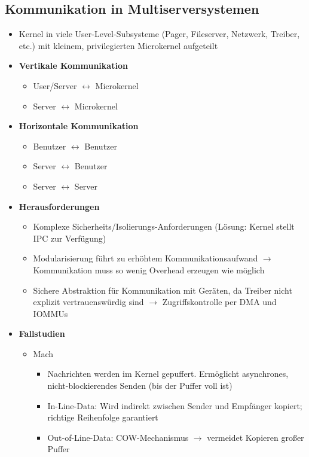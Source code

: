 \subsection{Kommunikation in Multiserversystemen}
\begin{itemize}
	\item Kernel in viele User-Level-Subsysteme (Pager, Fileserver, Netzwerk, Treiber, etc.) mit kleinem, privilegierten Microkernel aufgeteilt
	\item \textbf{Vertikale Kommunikation}
	\begin{itemize}
		\item User/Server \(\leftrightarrow\) Microkernel
		\item Server \(\leftrightarrow\) Microkernel
	\end{itemize}
	\item \textbf{Horizontale Kommunikation}
	\begin{itemize}
		\item Benutzer \(\leftrightarrow\) Benutzer
		\item Server \(\leftrightarrow\) Benutzer
		\item Server \(\leftrightarrow\) Server
	\end{itemize}
	\item \textbf{Herausforderungen}
	\begin{itemize}
		\item Komplexe Sicherheits/Isolierungs-Anforderungen (Lösung: Kernel stellt IPC zur Verfügung)
		\item Modularisierung führt zu erhöhtem Kommunikationsaufwand \(\rightarrow\) Kommunikation muss so wenig Overhead erzeugen wie möglich
		\item Sichere Abstraktion für Kommunikation mit Geräten, da Treiber nicht explizit vertrauenswürdig sind \(\rightarrow\) Zugriffskontrolle per DMA und IOMMUs
	\end{itemize}
	\item \textbf{Fallstudien}
	\begin{itemize}
		\item Mach
		\begin{itemize}
			\item Nachrichten werden im Kernel gepuffert. Ermöglicht asynchrones, nicht-blockierendes Senden (bis der Puffer voll ist)
			\item In-Line-Data: Wird indirekt zwischen Sender und Empfänger kopiert; richtige Reihenfolge garantiert
			\item Out-of-Line-Data: COW-Mechanismus \(\rightarrow\) vermeidet Kopieren großer Puffer

\end{itemize}
\end{itemize}
\end{itemize}
